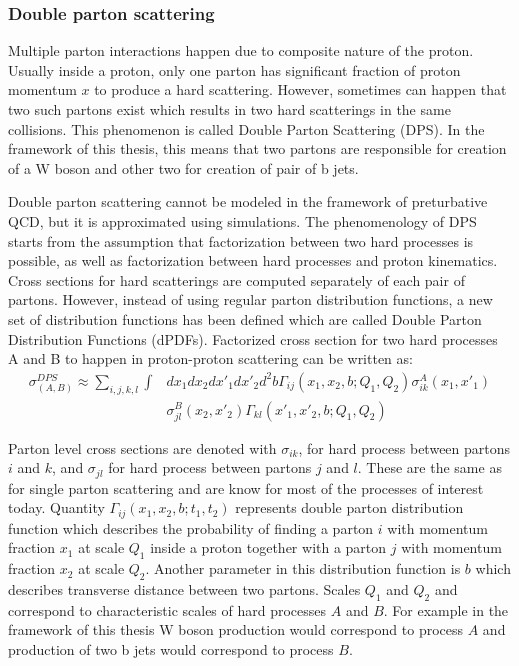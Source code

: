 \subsubsection{Double parton scattering}
\label{sec:DPS}
\cite{Quackenbush:2011bf}
\cite{Gaunt:2009re}
\par Multiple parton interactions happen due to composite nature of the proton. Usually inside a proton, only one parton has significant fraction of proton momentum $x$ to produce a hard scattering. However, sometimes can happen that two such partons exist which results in two hard scatterings in the same collisions. This phenomenon is called Double Parton Scattering (DPS). In the framework of this thesis, this means that two partons are responsible for creation of a W boson and other two for creation of pair of b jets. 
\par Double parton scattering cannot be modeled in the framework of preturbative QCD, but it is approximated using simulations. The phenomenology of DPS starts from the assumption that factorization between two hard processes is possible, as well as factorization between hard processes and proton kinematics. Cross sections for hard scatterings are computed separately of each pair of partons. However, instead of using regular parton distribution functions, a new set of distribution functions has been defined which are called Double Parton Distribution Functions (dPDFs). Factorized cross section for two hard processes A and B to happen in proton-proton scattering can be written as:
\begin{equation}
\begin{split}
\sigma_{(A,B)}^{DPS} \approx \sum\limits_{i,j,k,l} \int & dx_1 dx_2  dx'_1 dx'_2 d^2b  \Gamma_{ij}(x_1,x_2,b;Q_1,Q_2)\sigma_{ik}^A(x_1,x'_1) \\
 & \sigma_{jl}^B(x_2,x'_2) \Gamma_{kl}(x'_1,x'_2,b;Q_1,Q_2)
\end{split}
\end{equation}
\par Parton level cross sections are denoted with $\sigma_{ik}$, for hard process between partons $i$ and $k$, and $\sigma_{jl}$ for hard process between partons $j$ and $l$. These are the same as for single parton scattering and are know for most of the processes of interest today. Quantity $\Gamma_{ij}(x_1,x_2,b;t_1,t_2)$ represents double parton distribution function which describes the probability of finding a parton $i$ with momentum fraction $x_1$ at scale $Q_1$ inside a proton together with a parton $j$ with momentum fraction $x_2$ at scale $Q_2$. Another parameter in this distribution function is $b$ which describes transverse distance between two partons. Scales $Q_1$ and $Q_2$ and correspond to characteristic scales of hard processes $A$ and $B$. For example in the framework of this thesis W boson production would correspond to process $A$ and production of two b jets would correspond to process $B$.  

